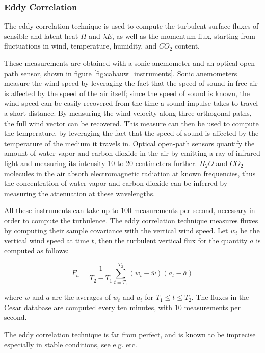 \documentclass[a4paper,11pt]{kth-mag}
\begin{document}
\subsubsection{Eddy Correlation}
\label{sec:eddy_correlation}
The eddy correlation technique is used to compute the turbulent surface fluxes of sensible and latent heat $H$ and $\lambda E$, as well as the momentum flux, starting from fluctuations in wind, temperature, humidity, and $CO_2$ content.

These measurements are obtained with a sonic anemometer and an optical open-path sensor, shown in figure \ref{fig:cabauw_instruments}. Sonic anemometers measure the wind speed by leveraging the fact that the speed of sound in free air is affected by the speed of the air itself; since the speed of sound is known, the wind speed can be easily recovered from the time a sound impulse takes to travel a short distance. By measuring the wind velocity along three orthogonal paths, the full wind vector can be recovered. This measure can then be used to compute the temperature, by leveraging the fact that the speed of sound is affected by the temperature of the medium it travels in. Optical open-path sensors quantify the amount of water vapor and carbon dioxide in the air by emitting a ray of infrared light and measuring its intensity 10 to 20 centimeters further. $H_2O$ and $CO_2$ molecules in the air absorb electromagnetic radiation at known frequencies, thus the concentration of water vapor and carbon dioxide can be inferred by measuring the attenuation at these wavelengths.

All these instruments can take up to 100 measurements per second, necessary in order to compute the turbulence. The eddy correlation technique measures fluxes by computing their sample covariance with the vertical wind speed. Let $w_t$ be the vertical wind speed at time $t$, then the turbulent vertical flux for the quantity $a$ is computed as follows:

$$
F_a=\frac{1}{T_2-T_1}\sum_{t=T_1}^{T_2}(w_t-\overline{w})(a_t-\overline{a})
$$

\noindent where $\overline{w}$ and $\overline{a}$ are the averages of $w_t$ and $a_t$ for $T_1\leq t\leq T_2$. The fluxes in the Cesar database are computed every ten minutes, with 10 measurements per second.

The eddy correlation technique is far from perfect, and is known to be imprecise especially in stable conditions, see e.g. \cite{microhandbook, ed_co2,cabauw_stable} etc.
\end{document}
